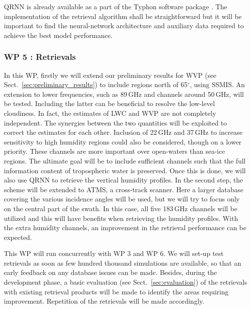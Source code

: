 \documentclass[12pt,oneside,a4paper]{article}
\begin{document}
QRNN is already available as a part of the Typhon software package
\citep{lemke:2020:typhon}. The implementation of the retrieval algorithm shall
be straightforward but it will be important to find the
neural-network architecture and auxiliary data required to achieve the best model performance.



\vspace{-1.0ex}
\subsubsection*{WP 5 : Retrievals}
%
\label{sec:retrievals}
%
In this WP, firstly we will extend our preliminary results for WVP (see
Sect.~\ref{sec:preliminary_results}) to include regions north of 65$^\circ$,
using SSMIS. An extension to lower frequencies, such as 89\,GHz and channels around 50\,GHz, will be tested. Including the latter can be beneficial to resolve the low-level cloudiness. In fact, the estimates of LWC and WVP are not completely independent. The synergies between the two quantities will be exploited to correct the estimates for each other. Inclusion of 22\,GHz and 37\,GHz to increase sensitivity to high humidity regions could also be considered, though on a lower priority. These channels are more important over open-waters than sea-ice regions. The ultimate goal will be to include sufficient channels such that the full information content of tropospheric water is preserved. Once this is done, we will also use QRNN to retrieve the vertical humidity profiles. In the second step, the scheme will be extended to ATMS, a cross-track scanner. Here a larger database covering the various incidence angles will be used, but we will try to focus only on the central part of the swath. In this case, all five 183\,GHz channels will be utilized and this will have benefits when retrieving the humidity profiles. With the extra humidity channels, an improvement in the retrieval performance can be expected.  


This WP will run concurrently with WP 3 and WP 6. We will set-up test retrievals as soon as few hundred thousand simulations are available, so that an early feedback on any database issues can be made. Besides, during the development phase, a basic evaluation (see Sect.~\ref{sec:evaluation}) of the retrievals with existing retrieval products will be made to identify the areas requiring improvement. Repetition of the retrievals will be made accordingly.
\end{document}
